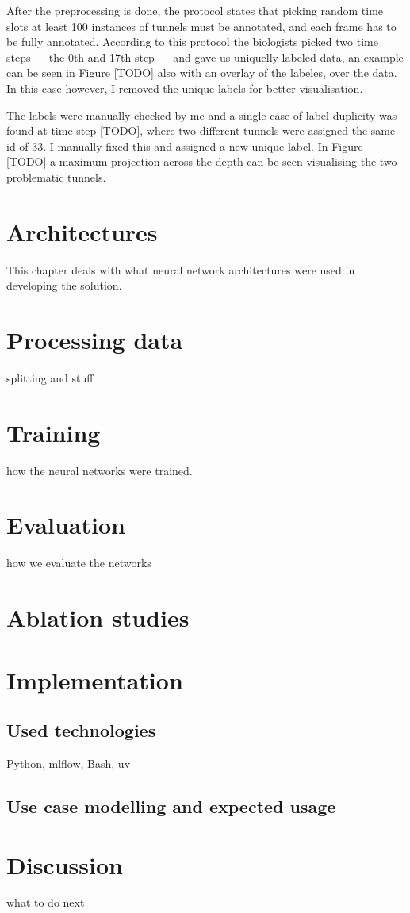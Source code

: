 \documentclass[
  digital,     %
  oneside,     %
  nosansbold,  %
  nocolorbold, %
  lof,         %
  lot,         %
]{fithesis4}
\begin{document}
After the preprocessing is done, the protocol states that picking random time
slots at least 100 instances of tunnels must be annotated, and each frame has to
be fully annotated. According to this protocol the biologists picked two time
steps --- the 0th and 17th step --- and gave us uniquelly labeled data, an
example can be seen in Figure [TODO] also with an overlay of the labeles, over
the data. In this case however, I removed the unique labels for better
visualisation.

The labels were manually checked by me and a single case of label duplicity was
found at time step [TODO], where two different tunnels were assigned the same id
of 33. I manually fixed this and assigned a new unique label. In Figure [TODO] a
maximum projection across the depth can be seen visualising the two problematic
tunnels.

\chapter{Architectures}
This chapter deals with what neural network architectures were used in
developing the solution.

\chapter{Processing data}
splitting and stuff

\chapter{Training}
how the neural networks were trained.

\chapter{Evaluation}
how we evaluate the networks

\chapter{Ablation studies}

\chapter{Implementation}

\section{Used technologies}
Python, mlflow, Bash, uv

\section{Use case modelling and expected usage}

\chapter{Discussion}
what to do next
\end{document}
